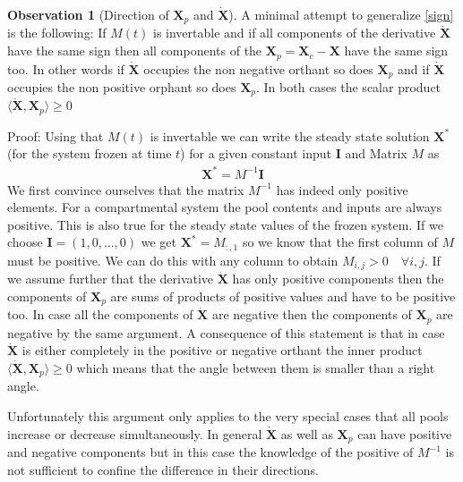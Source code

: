\documentclass[journal abbreviation, manuscript]{copernicus}
\theoremstyle{definition}
\newtheorem{observation}{Observation}[section]
\newcommand{\X}{\mathbf{X}}
\newcommand{\I}{\mathbf{I}}
\begin{document}
\begin{observation}[Direction of $\X_p$ and $\dot{\X}$]
A minimal attempt to generalize \eqref{sign} is the following:
If $M(t)$ is invertable 
and if all components of the derivative $\dot{\X}$ have the same sign then all components of the $\X_p=\X_c-\X$ have the same sign too.
In other words if $\dot{\X}$ occupies the non negative orthant so does $\X_p$ and if $\dot{\X}$ occupies the non positive orphant so does $\X_p$. In both cases the scalar product $\langle \dot{\X},\X_p \rangle \ge 0$

Proof:
Using that $M(t)$ is invertable we can write the steady state solution $\X^*$ (for the system frozen at time $t$) for a given constant input $\I$ and Matrix $M$ as
\begin{align}
\X^*=M^{-1}\I
\end{align}
We first convince ourselves that the matrix $M^{-1}$ has indeed only positive elements.
For a compartmental system the pool contents and inputs are always positive.
This is also true for the steady state values of the frozen system.
If we choose $\I = (1,0,\dots, 0) $ we get $\X^*=M_{:,1}$ so we know that 
the first column of $M$ must be positive. 
We can do this with any column to obtain $M_{i,j}>0 \quad \forall i,j$.
If we assume further that the derivative $\dot{\X}$ has only positive components then the components of 
$\X_p$ are sums of products of positive values and have to be positive too.
In case all the components of $\dot{\X}$ are negative then the components of $\X_p$ are negative by the same argument.
A consequence of this statement is that in case $\dot{\X}$ is either completely in the positive or negative orthant the inner product $\langle \dot{\X},\X_p \rangle \ge 0$ which means that the angle between them is smaller than a right angle.

Unfortunately this argument only applies to the very special cases that all pools increase or decrease simultaneously.
In general $\dot{\X}$ as well as $\X_p$ can have positive and negative components but in this case the knowledge of the positive
of $M^{-1}$ is not sufficient to confine the difference in their directions.
\end{observation}
\end{document}
